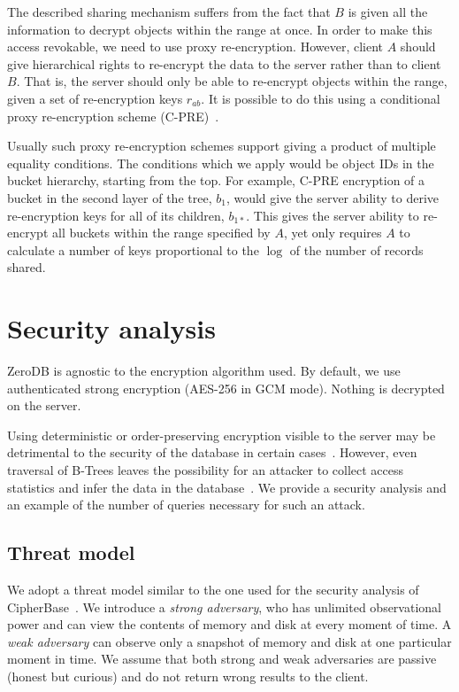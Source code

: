 \documentclass[notitlepage,longbibliography]{revtex4-1}
\begin{document}
The described sharing mechanism suffers from the fact that $B$ is given all the information to decrypt objects within the range at once.
In order to make this access revokable, we need to use proxy re-encryption.
However, client $A$ should give hierarchical rights to re-encrypt the data to the server rather than to client $B$.
That is, the server should only be able to re-encrypt objects within the range, given a set of re-encryption keys $r_{ab}$.
It is possible to do this using a conditional proxy re-encryption scheme (C-PRE)~\cite{conditional-pre-2009,unidirectional-pre-2010,conditional-pre-2014,hierarchical-pre}.

Usually such proxy re-encryption schemes support giving a product of multiple equality conditions.
The conditions which we apply would be object IDs in the bucket hierarchy, starting from the top.
For example, C-PRE encryption of a bucket in the second layer of the tree, $b_1$, would give the server ability to derive re-encryption keys for all of its children, $b_{1*}$.
This gives the server ability to re-encrypt all buckets within the range specified by $A$, yet only requires $A$ to calculate a number of keys proportional to the $\log$ of the number of records shared.

\section{Security analysis}

ZeroDB is agnostic to the encryption algorithm used.
By default, we use authenticated strong encryption ({AES-256} in GCM mode).
Nothing is decrypted on the server.

Using deterministic or order-preserving encryption visible to the server may be detrimental to the security of the database in certain cases~\cite{cryptdb-hacked}.
However, even traversal of B-Trees leaves the possibility for an attacker to collect access statistics and infer the data in the database~\cite{access-pattern-attack}.
We provide a security analysis and an example of the number of queries necessary for such an attack.

\subsection{Threat model}

We adopt a threat model similar to the one used for the security analysis of CipherBase~\cite{cipherbase}.
We introduce a \emph{strong adversary}, who has unlimited observational power and can view the contents of memory and disk at every moment of time.
A \emph{weak adversary} can observe only a snapshot of memory and disk at one particular moment in time.
We assume that both strong and weak adversaries are passive (honest but curious) and do not return wrong results to the client.
\end{document}
